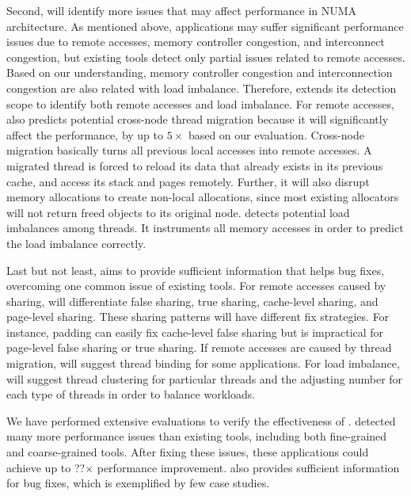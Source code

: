 Second, \NP{} will identify more issues that may affect performance in NUMA architecture. As mentioned above, applications may suffer significant performance issues due to remote accesses, memory controller congestion, and interconnect congestion, but existing tools detect only partial issues related to remote accesses. Based on our understanding, memory controller congestion and interconnection congestion are also related with load imbalance. Therefore, \NP{} extends its detection scope to identify both remote accesses and load imbalance. For remote accesses, \NP{} also predicts potential cross-node thread migration because it will significantly affect the performance, by up to $5\times$ based on our evaluation. Cross-node migration basically turns all previous local accesses into remote accesses. A migrated thread is forced to reload its data that already exists in its previous cache, and access its stack and pages remotely. Further, it will also disrupt memory allocations to create non-local allocations, since most existing allocators will not return freed objects to its original node. \NP{} detects potential load imbalances among threads. It instruments all memory accesses in order to predict the load imbalance correctly. 

Last but not least, \NP{} aims to provide sufficient information that helps bug fixes, overcoming one common issue of existing tools. For remote accesses caused by sharing, \NP{} will differentiate false sharing, true sharing, cache-level sharing, and page-level sharing. These sharing patterns will have different fix strategies. For instance, padding can easily fix cache-level false sharing but is impractical for page-level false sharing or true sharing. If remote accesses are caused by thread migration, \NP{} will suggest thread binding for some applications. For load imbalance, \NP{} will suggest thread clustering for particular threads and the adjusting number for each type of threads in order to balance workloads.   



We have performed extensive evaluations to verify the effectiveness of \NP{}. \NP{} detected many more performance issues than existing tools, including both fine-grained and coarse-grained tools.  After fixing these issues, these applications could achieve up to ??$\times$ performance improvement. 
\NP{} also provides sufficient information for bug fixes, which is exemplified by few case studies. 

